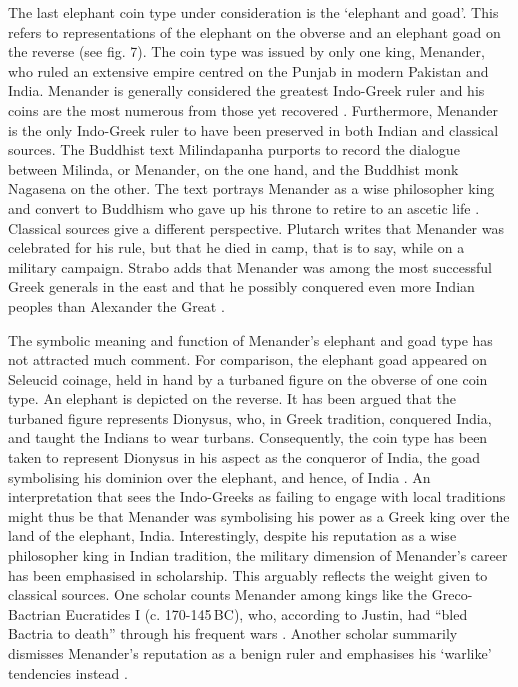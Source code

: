 \documentclass{ijsra}
\renewcommand\BC{{\,BC\xspace}}
\begin{document}
The last elephant coin type under consideration is the ‘elephant and goad’.
This refers to representations of the elephant on the obverse and an elephant goad on the reverse (see fig. 7). 
The coin type was issued by only one king, Menander, who ruled an extensive empire centred on the Punjab in modern Pakistan and India. 
Menander is generally considered the greatest Indo-Greek ruler and his coins are the most numerous from those yet recovered \parencite[14--17]{Bopearachchi1993}.
Furthermore, Menander is the only Indo-Greek ruler to have been preserved in both Indian and classical sources. 
The Buddhist text Milindapanha purports to record the dialogue between Milinda, or Menander, on the one hand,
and the Buddhist monk Nagasena on the other. 
The text portrays Menander as a wise philosopher king and convert to Buddhism who gave up his throne to retire to an ascetic life
\parencite[14--17]{Bopearachchi1993}. 
Classical sources give a different perspective.
Plutarch writes that Menander was celebrated for his rule, but that he died in camp, that is to say, while on a military campaign. 
Strabo adds that Menander was among the most successful Greek generals in the east and that he possibly conquered even more
Indian peoples than Alexander the Great \parencite[180, 183]{Holt1999}.

The symbolic meaning and function of Menander’s elephant and goad type has not attracted much comment. 
For comparison, the elephant goad appeared on Seleucid coinage, held in hand by a turbaned figure on the obverse of one coin type.
An elephant is depicted on the reverse. 
It has been argued that the turbaned figure represents Dionysus, who, in Greek tradition, conquered India,
and taught the Indians to wear turbans.
Consequently, the coin type has been taken to represent Dionysus in his aspect as the conqueror of India,
the goad symbolising his dominion over the elephant, and hence, of India \parencite[147--164]{Iossif2010}.
An interpretation that sees the Indo-Greeks as failing to engage with local traditions might thus be that Menander was
symbolising his power as a Greek king over the land of the elephant, India.
Interestingly, despite his reputation as a wise philosopher king in Indian tradition, the military dimension of Menander’s
career has been emphasised in scholarship. 
This arguably reflects the weight given to classical sources.
One scholar counts Menander among kings like the Greco-Bactrian Eucratides I (c. 170-145\BC), who, according to Justin,
had “bled Bactria to death” through his frequent wars \parencite[128]{Holt2005}. 
Another scholar summarily dismisses Menander’s reputation as a benign ruler and emphasises his ‘warlike’ tendencies instead \parencite[15--16]{Widemann2007}.
\end{document}

